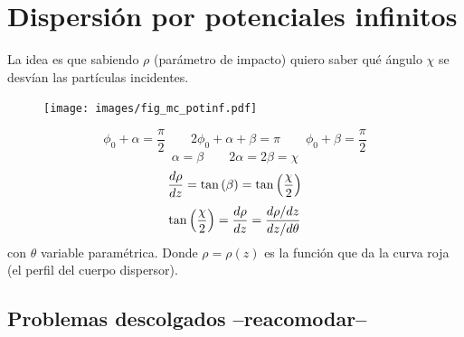 \documentclass[10pt,oneside]{CBFT_book}
\begin{document}
\section{Dispersión por potenciales infinitos}

La idea es que sabiendo $\rho$ (parámetro de impacto) quiero saber qué ángulo $\chi$ se desvían las
partículas incidentes.
\begin{figure}[htb]
	\begin{center}
	\texttt{[image: images/fig\_mc\_potinf.pdf]}	 
	\end{center}
	\caption{}
\end{figure} 
\[
	\phi_0 + \alpha = \frac{\pi}{2}		\qquad		2 \phi_0 + \alpha + \beta = \pi
	\qquad \phi_0 + \beta = \frac{\pi}{2}
\]
\[
	\alpha = \beta		\qquad 		2\alpha = 2\beta = \chi
\]
\[
	\frac{d^{\hspace{-0.05em}} {\rho}}{d {z}^{\hspace{-0.05em}}} = \tan \left(\beta \right) = \tan\left(\frac{\chi}{2}\right)
\]
\[
	\tan\left(\frac{\chi}{2}\right) = \frac{d^{\hspace{-0.05em}} {\rho}}{d {z}^{\hspace{-0.05em}}} = \frac{ d\rho/dz }{ dz/d\theta }
\]
con $\theta$ variable paramétrica. Donde $\rho = \rho(z)$ es la función que da la curva roja (el perfil
del cuerpo dispersor).

\subsection{Problemas descolgados --reacomodar--}
\end{document}
